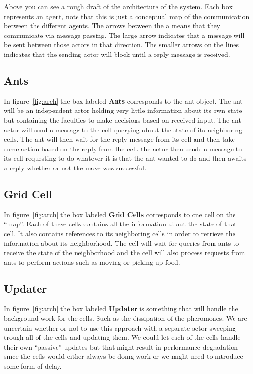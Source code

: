 \documentclass[a4paper]{article}
\begin{document}
Above you can see a rough draft of the architecture of the system. Each box
represents an agent, note that this is just a conceptual map of the
communication between the different agents. The arrows between the a means that
they communicate via message passing.
The large arrow indicates that a message will be sent between those actors in that
direction. The smaller arrows on the lines indicates that the sending actor
will block until a reply message is received.

\subsection{Ants}
In figure~\ref{fig:arch} the box labeled \textbf{Ants} corresponds to the ant
object.
The ant will be an independent actor holding very little information about its
own state but containing the faculties to make decisions based on received
input. The ant actor will send a message to the cell querying about the state
of its neighboring cells. The ant will then wait for the reply message from its
cell and then take some action based on the reply from the cell. the actor then
sends a message to its cell requesting to do whatever it is that the ant wanted
to do and then awaits a reply whether or not the move was successful.

\subsection{Grid Cell}
In figure~\ref{fig:arch} the box labeled \textbf{Grid Cells} corresponds to one
cell on the ``map''. Each of these cells contains all the information about the state of
that cell. It also contains references to its neighboring cells in order to
retrieve the information about its neighborhood. The cell will wait for queries
from ants to receive the state of the neighborhood and the cell will also
process requests from ants to perform actions such as moving or picking up food.

\subsection{Updater}
In figure~\ref{fig:arch} the box labeled \textbf{Updater} is something that will
handle the background work for the cells. Such as the dissipation of the pheromones.
We are uncertain whether or not to use this approach with a separate actor sweeping
trough all of the cells and updating them. We could let each of the cells handle
their own ``passive'' updates but that might result in performance degradation
since the cells would either always be doing work or we might need to introduce
some form of delay.
\end{document}
